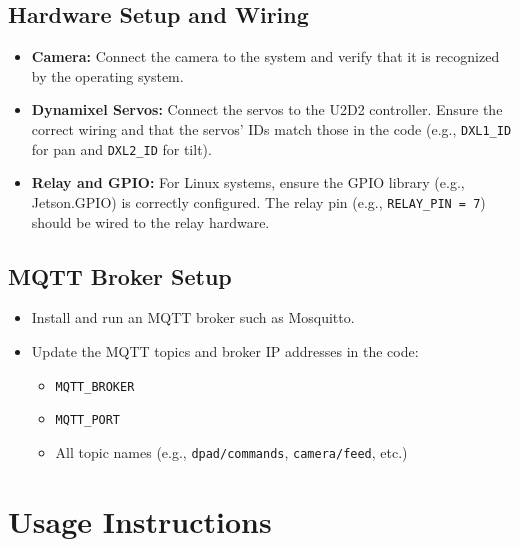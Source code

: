 \documentclass[12pt]{article}
\begin{document}
\subsection{Hardware Setup and Wiring}
\begin{itemize}[leftmargin=*, label={--}]
    \item \textbf{Camera:} Connect the camera to the system and verify that it is recognized by the operating system.
    \item \textbf{Dynamixel Servos:} Connect the servos to the U2D2 controller. Ensure the correct wiring and that the servos' IDs match those in the code (e.g., \texttt{DXL1\_ID} for pan and \texttt{DXL2\_ID} for tilt).
    \item \textbf{Relay and GPIO:} For Linux systems, ensure the GPIO library (e.g., Jetson.GPIO) is correctly configured. The relay pin (e.g., \texttt{RELAY\_PIN = 7}) should be wired to the relay hardware.
\end{itemize}

\subsection{MQTT Broker Setup}
\begin{itemize}[leftmargin=*, label={--}]
    \item Install and run an MQTT broker such as Mosquitto.
    \item Update the MQTT topics and broker IP addresses in the code:
    \begin{itemize}[leftmargin=*, label={*}]
        \item \texttt{MQTT\_BROKER}
        \item \texttt{MQTT\_PORT}
        \item All topic names (e.g., \texttt{dpad/commands}, \texttt{camera/feed}, etc.)
    \end{itemize}
\end{itemize}

\section{Usage Instructions}
\end{document}
